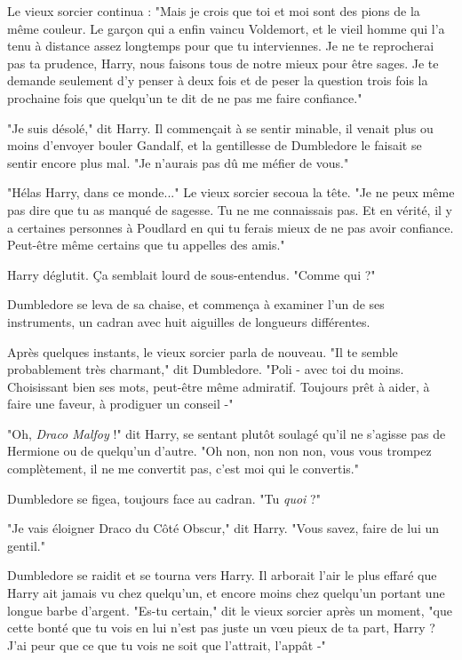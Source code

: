 Le vieux sorcier continua : "Mais je crois que toi et moi sont des pions de la même couleur. Le garçon qui a enfin vaincu Voldemort, et le vieil homme qui l'a tenu à distance assez longtemps pour que tu interviennes. Je ne te reprocherai pas ta prudence, Harry, nous faisons tous de notre mieux pour être sages. Je te demande seulement d'y penser à deux fois et de peser la question trois fois la prochaine fois que quelqu'un te dit de ne pas me faire confiance."

"Je suis désolé," dit Harry. Il commençait à se sentir minable, il venait plus ou moins d'envoyer bouler Gandalf, et la gentillesse de Dumbledore le faisait se sentir encore plus mal. "Je n'aurais pas dû me méfier de vous."

"Hélas Harry, dans ce monde..." Le vieux sorcier secoua la tête. "Je ne peux même pas dire que tu as manqué de sagesse. Tu ne me connaissais pas. Et en vérité, il y a certaines personnes à Poudlard en qui tu ferais mieux de ne pas avoir confiance. Peut-être même certains que tu appelles des amis."

Harry déglutit. Ça semblait lourd de sous-entendus. "Comme qui ?"

Dumbledore se leva de sa chaise, et commença à examiner l'un de ses instruments, un cadran avec huit aiguilles de longueurs différentes.

Après quelques instants, le vieux sorcier parla de nouveau. "Il te semble probablement très charmant," dit Dumbledore. "Poli - avec toi du moins. Choisissant bien ses mots, peut-être même admiratif. Toujours prêt à aider, à faire une faveur, à prodiguer un conseil -"

"Oh, \emph{Draco Malfoy}  !" dit Harry, se sentant plutôt soulagé qu'il ne s'agisse pas de Hermione ou de quelqu'un d'autre. "Oh non, non non non, vous vous trompez complètement, il ne me convertit pas, c'est moi qui le convertis."

Dumbledore se figea, toujours face au cadran. "Tu \emph{quoi}  ?"

"Je vais éloigner Draco du Côté Obscur," dit Harry. "Vous savez, faire de lui un gentil."

Dumbledore se raidit et se tourna vers Harry. Il arborait l'air le plus effaré que Harry ait jamais vu chez quelqu'un, et encore moins chez quelqu'un portant une longue barbe d'argent. "Es-tu certain," dit le vieux sorcier après un moment, "que cette bonté que tu vois en lui n'est pas juste un vœu pieux de ta part, Harry ? J'ai peur que ce que tu vois ne soit que l'attrait, l'appât -"

